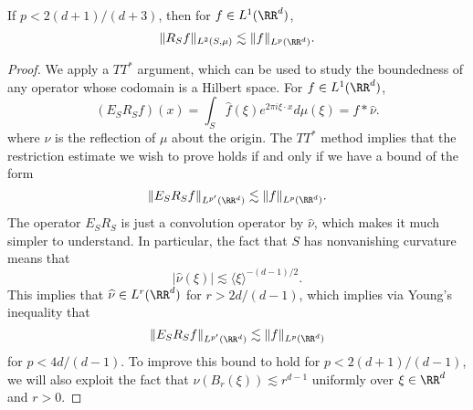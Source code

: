 \begin{theorem}
  If $p < 2(d+1)/(d+3)$, then for $f \in L^1(\RR^d)$,
  \[ \| R_S f \|_{L^2(S,\mu)} \lesssim \| f \|_{L^p(\RR^d)}. \]
\end{theorem}
\begin{proof}
  We apply a $TT^*$ argument, which can be used to study the boundedness of any operator whose codomain is a Hilbert space. For $f \in L^1(\RR^d)$,
  \[ (E_S R_S f)(x) = \int_S \widehat{f}(\xi) e^{2\pi i \xi \cdot x} d\mu(\xi) = f * \widehat{\nu}. \]
  where $\nu$ is the reflection of $\mu$ about the origin. The $TT^*$ method implies that the restriction estimate we wish to prove holds if and only if we have a bound of the form
  \[ \| E_S R_S f \|_{L^{p'}(\RR^d)} \lesssim \| f \|_{L^p(\RR^d)}. \]
  The operator $E_S R_S$ is just a convolution operator by $\widehat{\nu}$, which makes it much simpler to understand. In particular, the fact that $S$ has nonvanishing curvature means that
  \[ |\widehat{\nu}(\xi)| \lesssim \langle \xi \rangle^{-(d-1)/2}. \]
  This implies that $\widehat{\nu} \in L^r(\RR^d)$ for $r > 2d/(d-1)$, which implies via Young's inequality that
  \[ \| E_S R_S f \|_{L^{p'}(\RR^d)} \lesssim \| f \|_{L^p(\RR^d)} \]
  for $p < 4d/(d - 1)$. To improve this bound to hold for $p < 2(d+1)/(d-1)$, we will also exploit the fact that $\nu(B_r(\xi)) \lesssim r^{d-1}$ uniformly over $\xi \in \RR^d$ and $r > 0$.


\end{proof}
